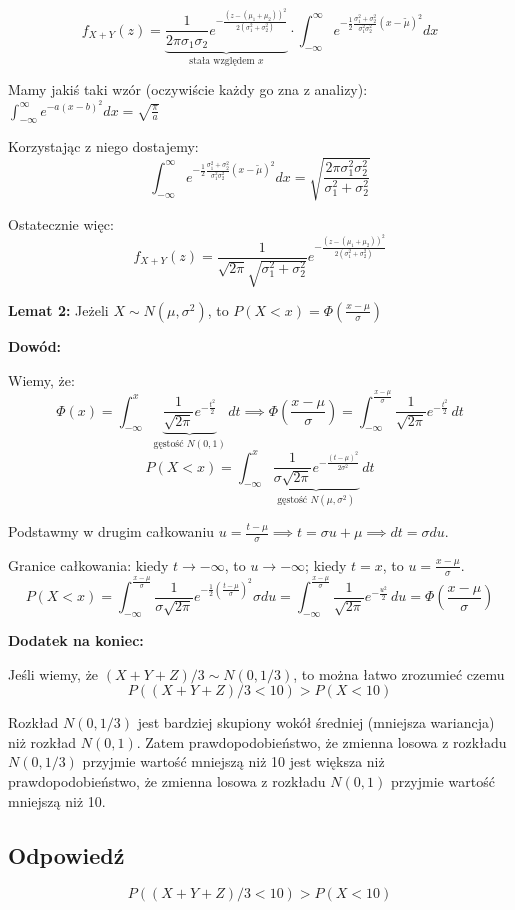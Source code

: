 \[f_{X+Y}(z) = \underbrace{\frac{1}{2\pi \sigma_1 \sigma_2} e^{-\frac{(z - (\mu_1+\mu_2))^2}{2(\sigma_1^2 + \sigma_2^2)}}}_{\text{stała względem } x} \cdot \int_{-\infty}^{\infty} e^{-\frac{1}{2} \frac{\sigma_1^2+\sigma_2^2}{\sigma_1^2\sigma_2^2}(x - \tilde{\mu})^2} dx\]

Mamy jakiś taki wzór (oczywiście każdy go zna z analizy): \(\int_{-\infty}^{\infty} e^{-a(x-b)^2} dx = \sqrt{\frac{\pi}{a}}\)

Korzystając z niego dostajemy:
\[\int_{-\infty}^{\infty} e^{-\frac{1}{2} \frac{\sigma_1^2+\sigma_2^2}{\sigma_1^2\sigma_2^2}(x - \tilde{\mu})^2} dx = \sqrt{\frac{2 \pi \sigma_1^2 \sigma_2^2}{\sigma_1^2 + \sigma_2^2}}\]

Ostatecznie więc:
\[f_{X+Y}(z) = \frac{1}{\sqrt{2 \pi} \sqrt{\sigma_1^2 + \sigma_2^2}} e^{-\frac{(z - (\mu_1 + \mu_2))^2}{2(\sigma_1^2 + \sigma_2^2)}}\]

\textbf{Lemat 2:} Jeżeli \(X \sim N(\mu, \sigma^2)\), to \(P(X < x) = \Phi\left(\frac{x - \mu}{\sigma}\right)\)

\textbf{Dowód:}

Wiemy, że:
\[\Phi(x) = \int_{-\infty}^{x} \underbrace{\frac{1}{\sqrt{2\pi}} e^{-\frac{t^2}{2}}}_{\text{gęstość } N(0, 1)} \, dt \implies \Phi\left(\frac{x - \mu}{\sigma}\right) = \int_{-\infty}^{\frac{x - \mu}{\sigma}} \frac{1}{\sqrt{2\pi}} e^{-\frac{t^2}{2}} \, dt\]
\[P(X < x) = \int_{-\infty}^{x} \underbrace{\frac{1}{\sigma\sqrt{2\pi}} e^{-\frac{(t - \mu)^2}{2\sigma^2}}}_{\text{gęstość } N(\mu, \sigma^2)} \, dt\]

Podstawmy w drugim całkowaniu \(u = \frac{t - \mu}{\sigma} \implies t = \sigma u + \mu \implies dt = \sigma du\).

Granice całkowania: kiedy \(t \to -\infty\), to \(u \to -\infty\); kiedy \(t = x\), to \(u = \frac{x - \mu}{\sigma}\).
\[P(X < x) = \int_{-\infty}^{\frac{x - \mu}{\sigma}} \frac{1}{\sigma \sqrt{2\pi}} e^{-\frac{1}{2} \left(\frac{t-\mu}{\sigma}\right)^2} \sigma du = \int_{-\infty}^{\frac{x - \mu}{\sigma}} \frac{1}{\sqrt{2\pi}} e^{-\frac{u^2}{2}} \, du = \Phi\left(\frac{x - \mu}{\sigma}\right)\]


\textbf{Dodatek na koniec:}

Jeśli wiemy, że \((X + Y + Z) / 3 \sim N(0, 1/3)\), to można łatwo zrozumieć czemu \[P((X + Y + Z)/3 < 10) > P(X < 10)\]

Rozkład \(N(0, 1/3)\) jest bardziej skupiony wokół średniej (mniejsza wariancja) niż rozkład \(N(0, 1)\).
Zatem prawdopodobieństwo, że zmienna losowa z rozkładu \(N(0, 1/3)\) przyjmie wartość mniejszą niż 10
jest większa niż prawdopodobieństwo, że zmienna losowa z rozkładu \(N(0, 1)\) przyjmie wartość mniejszą niż 10.

\subsection*{Odpowiedź}
\[
	\boxed{P((X + Y + Z)/3 < 10) > P(X < 10)}
\]
